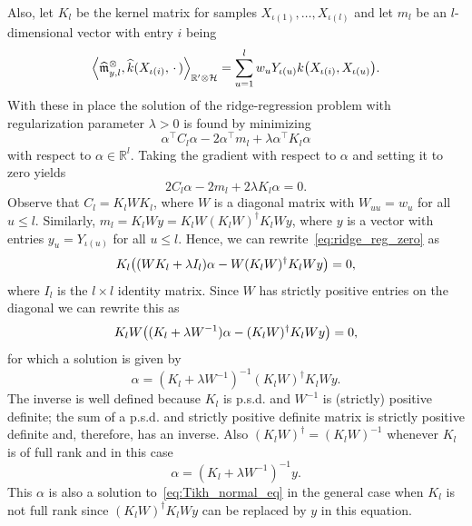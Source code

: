 \documentclass[AHL,Unicode,longabstracts,published]{cedram}
\theoremstyle{remark}
\newcommand{\R}{\mathbb{R}}
\newcommand{\dR}{{\R'}}
\newcommand{\cH}{\mathcal{H}}
\newcommand{\mean}{\mathfrak{m}}
\let\oldhat\hat
\renewcommand*{\hat}[1]{\mathchoice{\widehat{#1}}{\widehat{#1}}{\oldhat{#1}}{\oldhat{#1}}}
\let\originalleft\left
\let\originalright\right
\renewcommand{\left}{\mathopen{}\mathclose\bgroup\originalleft}
\renewcommand{\right}{\aftergroup\egroup\originalright}
\begin{document}
Also, let $K_l$ be the kernel matrix for samples $X_{\iota(1)},\dots, X_{\iota(l)}$ and let $m_l$ be an $l$-dimensional vector with entry $i$ being
\[
\left\langle \hat \mean^\otimes_{y,l}, \hat k(X_{\iota(i)},\,\cdot\,) \right\rangle_{\dR \otimes \cH} = \sum_{u=1}^l w_u Y_{\iota(u)} k\left(X_{\iota(i)}, X_{\iota(u)}\right).
\]
With these in place the solution of the ridge-regression problem with regularization parameter $\lambda >0$ is found by minimizing
\[
\alpha^\top C_l \alpha - 2 \alpha^\top m_l + \lambda \alpha^\top K_l \alpha
\]
with respect to $\alpha \in \R^l$. Taking the gradient with respect to $\alpha$ and setting it to zero yields
\begin{equation}\label{eq:ridge_reg_zero}
2 C_l \alpha - 2 m_l + 2 \lambda K_l \alpha = 0.
\end{equation}
Observe that $C_l = K_l W K_l$, where $W$ is a diagonal matrix with $W_{uu} =w_u$ for all $u\leq l$. Similarly, $m_l = K_l W y = K_l W (K_l W)^\dagger K_l W y$, where $y$ is a vector with entries $y_u = Y_{\iota(u)}$ for all $u\leq l$. Hence, we can rewrite~\eqref{eq:ridge_reg_zero} as
\[
K_l \left((WK_l + \lambda I_l) \alpha - W (K_l W)^\dagger K_l W y\right)=0,
\]
where $I_l$ is the $l\times l$ identity matrix. Since $W$ has strictly positive entries on the diagonal we can rewrite this as
\begin{equation}\label{eq:Tikh_normal_eq}
K_lW \left((K_l + \lambda W^{-1}) \alpha - (K_l W)^\dagger K_l W y\right)=0,
\end{equation}
for which a solution is given by
\begin{equation}\label{eq:Tikh_minimal}
\alpha = (K_l + \lambda W^{-1})^{-1} (K_l W)^\dagger K_l Wy.
\end{equation}
The inverse is well defined because $K_l$ is p.s.d. and $W^{-1}$ is (strictly) positive definite; the sum of a p.s.d. and strictly positive definite matrix is strictly positive definite and, therefore, has an inverse. Also $(K_l W)^\dagger = (K_l W)^{-1}$ whenever $K_l$ is of full rank and in this case
\begin{equation}\label{eq:Tikh_suboptimal}
\alpha = (K_l + \lambda W^{-1})^{-1} y.
\end{equation}
This $\alpha$ is also a solution to~\eqref{eq:Tikh_normal_eq} in the general case when $K_l$ is not full rank since $(K_l W)^\dagger K_l W y$ can be replaced by $y$ in this equation.
\end{document}
